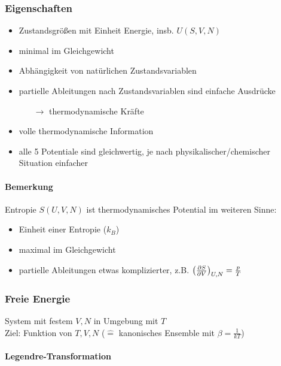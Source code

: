 \subsubsection{Eigenschaften}
\begin{itemize}
    \item Zustandsgrößen mit Einheit Energie, insb. $U(S,V,N)$
    \item minimal im Gleichgewicht
    \item Abhängigkeit von natürlichen Zustandsvariablen
    \item partielle Ableitungen nach Zustandsvariablen sind einfache Ausdrücke
    \begin{itemize}
    \item[$\rightarrow$] thermodynamische Kräfte
    \end{itemize}
    \item volle thermodynamische Information
    \item alle 5 Potentiale sind gleichwertig, je nach physikalischer/chemischer Situation einfacher
\end{itemize}

\paragraph{Bemerkung} Entropie $S(U,V,N)$ ist thermodynamisches Potential im weiteren Sinne:
\begin{itemize}
    \item Einheit einer Entropie ($k_B$)
    \item maximal im Gleichgewicht
    \item partielle Ableitungen etwas komplizierter, z.B. $\left(\frac{\partial S}{\partial V}\right)_{U,N} = \frac{p}{T}$
\end{itemize}

\subsubsection{Freie Energie}
System mit festem $V,N$ in Umgebung mit $T$ \\
Ziel: Funktion von $T,V,N$ ($\widehat{=}$ kanonisches Ensemble mit $\beta = \frac{1}{kT}$)

\paragraph{Legendre-Transformation}

